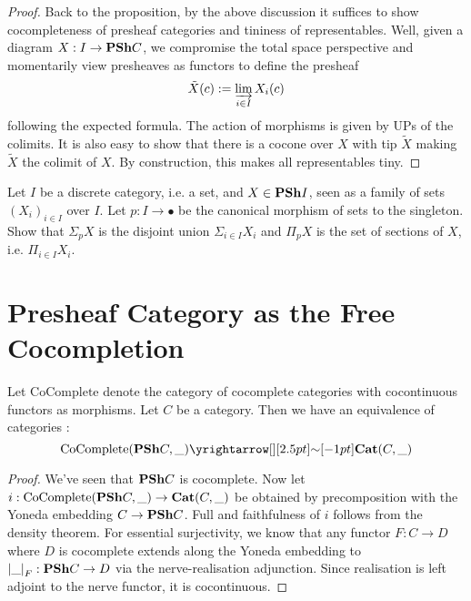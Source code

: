 \documentclass{article}
\begin{document}
\begin{proof}
  Back to the proposition,
  by the above discussion 
  it suffices to show cocompleteness of presheaf categories and 
  tininess of representables.
  Well, given a diagram $X : I \to \mathbf{PSh} C$,
  we compromise the total space perspective and
  momentarily view presheaves as functors to define the presheaf
  \[
    \tilde{X}(c) := \varinjlim_{i \in I} X_i(c)
  \]
  following the expected formula.
  The action of morphisms is given by UPs of the colimits.
  It is also easy to show that there is a cocone over $X$ with 
  tip $\tilde{X}$ making $\tilde{X}$ the colimit of $X$.
  By construction, this makes all representables tiny.
\end{proof}

\begin{eg}
  
  Let $I$ be a discrete category, i.e. a set,
  and $X \in \mathbf{PSh} I$, seen as a family of sets $(X_i)_{i \in I}$ over $I$.
  Let $p : I \to \bullet$ be the canonical morphism of sets to the singleton.
  Show that $\Sigma_p X$ is the disjoint union $\Sigma_{i \in I} X_i$
  and $\Pi_p X$ is the set of sections of $X$,
  i.e. $\Pi_{i \in I} X_i$.
\end{eg}

\section{Presheaf Category as the Free Cocompletion}

\begin{prop}
  
  Let $\mathrm{CoComplete}$ denote the category of
  cocomplete categories with cocontinuous functors as morphisms.
  Let $C$ be a category.
  Then we have an equivalence of categories : 
  \[
    \mathrm{CoComplete}(\PSH C , \_) \map{\sim}{}
    \mathbf{Cat}(C , \_)
  \]
\end{prop}
\begin{proof}
  We've seen that $\mathbf{PSh} C$ is cocomplete.
  Now let $i : \mathrm{CoComplete}(\mathbf{PSh} C , \_) \to \mathbf{Cat}(C , \_)$
  be obtained by precomposition with the Yoneda embedding $C \to \mathbf{PSh} C$.
  Full and faithfulness of $i$ follows from the density theorem.
  For essential surjectivity, 
  we know that any functor $F : C \to D$ where $D$ is cocomplete
  extends along the Yoneda embedding to $\left\vert  \_  \right\vert_F : \mathbf{PSh} C \to D$ via
  the nerve-realisation adjunction.
  Since realisation is left adjoint to the nerve functor,
  it is cocontinuous.
\end{proof}
\end{document}
